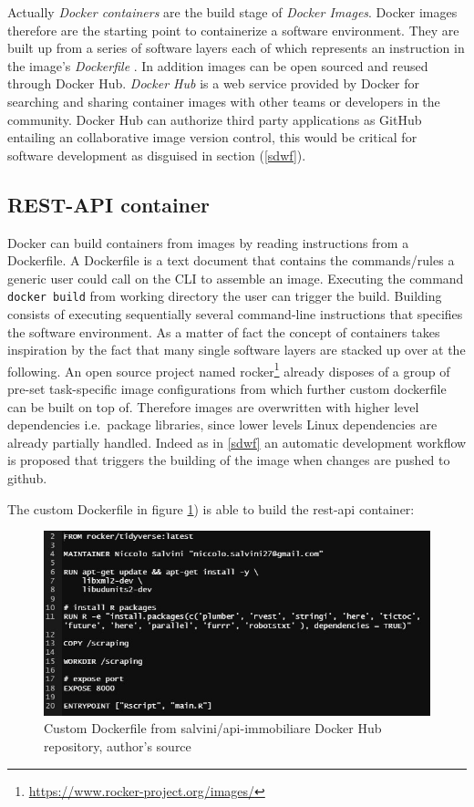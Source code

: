 \documentclass[
  12pt,
  a4paper,
  oneside]{book}
\newcommand{\passthrough}[1]{#1}
\DeclareRobustCommand{\href}[2]{#2\footnote{\url{#1}}}
\theoremstyle{definition}
\theoremstyle{definition}
\theoremstyle{definition}
\theoremstyle{remark}
\begin{document}
Actually \emph{Docker containers} are the build stage of \emph{Docker Images}. Docker images therefore are the starting point to containerize a software environment. They are built up from a series of software layers each of which represents an instruction in the image's \emph{Dockerfile} \citeyearpar{docker_documentation_2020} . In addition images can be open sourced and reused through Docker Hub.
\emph{Docker Hub} is a web service provided by Docker for searching and sharing container images with other teams or developers in the community. Docker Hub can authorize third party applications as GitHub entailing an collaborative image version control, this would be critical for software development as disguised in section (\ref{sdwf}).

\hypertarget{dockerfile}{%
\subsection{REST-API container}\label{dockerfile}}

Docker can build containers from images by reading instructions from a Dockerfile. A Dockerfile is a text document that contains the commands/rules a generic user could call on the CLI to assemble an image. Executing the command \passthrough{\lstinline!docker build!} from working directory the user can trigger the build. Building consists of executing sequentially several command-line instructions that specifies the software environment. As a matter of fact the concept of containers takes inspiration by the fact that many single software layers are stacked up over at the following. An open source project named \href{https://www.rocker-project.org/images/}{rocker} already disposes of a group of pre-set task-specific image configurations from which further custom dockerfile can be built on top of.
Therefore images are overwritten with higher level dependencies i.e.~package libraries, since lower levels Linux dependencies are already partially handled. Indeed as in \ref{sdwf} an automatic development workflow is proposed that triggers the building of the image when changes are pushed to github.

The custom Dockerfile in figure \ref{fig:dockerfile}) is able to build the rest-api container:

\begin{figure}
\centering
\includegraphics{images/dockerfile2.PNG.jpg}
\caption{\label{fig:dockerfile}Custom Dockerfile from salvini/api-immobiliare Docker Hub repository, author's source}
\end{figure}
\end{document}
